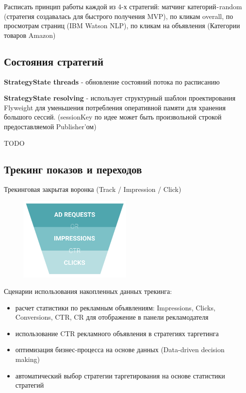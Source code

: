 \documentclass[times]{itmo-student-thesis}
\begin{document}
Расписать принцип работы каждой из 4-х стратегий: матчинг категорий - random (стратегия создавалась для быстрого получения MVP), по кликам overall, по просмотрам страниц (IBM Watson NLP), по кликам на объявления (Категории товаров Amazon)

\subsection{Состояния стратегий}\label{sec:strategies-state}

\textbf{StrategyState threads} - обновление состояний потока по расписанию

\textbf{StrategyState resolving} - использует структурный шаблон проектирования Flyweight для уменьшения потребления оперативной памяти для хранения большого сессий. (sessionKey по идее может быть произвольной строкой предоставляемой Publisher'ом)

TODO

\subsection{Трекинг показов и переходов}

Трекинговая закрытая воронка (Track / Impression / Click)

\begin{figure}[h]
\includegraphics[width=0.5\textwidth]{funnel}
\centering
\end{figure}

Сценарии использования накопленных данных трекинга:
\begin{itemize}
	\item расчет статистики по рекламным объявлениям: Impressions, Clicks, Conversions, CTR, CR для отображение в панели рекламодателя
	\item использование CTR рекламного объявления в стратегиях таргетинга
	\item оптимизация бизнес-процесса на основе данных (Data-driven decision making)
	\item автоматический выбор стратегии таргетирования на основе статистики стратегий
\end{itemize}
\end{document}

